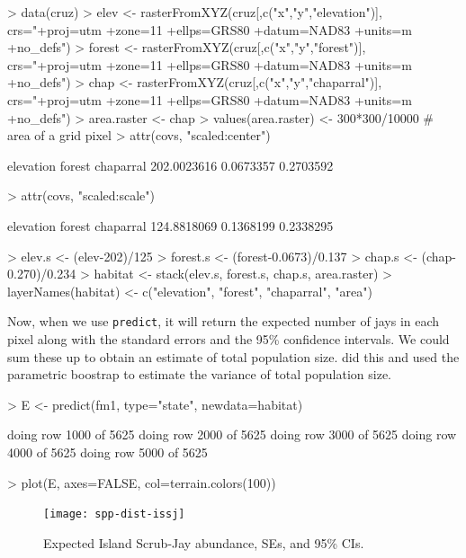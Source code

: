 \documentclass[a4paper]{article}
\renewenvironment{Schunk}{\vspace{\topsep}}{\vspace{\topsep}}
\begin{document}
\begin{Schunk}
\begin{Sinput}
> data(cruz)
> elev <- rasterFromXYZ(cruz[,c("x","y","elevation")],
      crs="+proj=utm +zone=11 +ellps=GRS80 +datum=NAD83 +units=m +no_defs")
> forest <- rasterFromXYZ(cruz[,c("x","y","forest")],
      crs="+proj=utm +zone=11 +ellps=GRS80 +datum=NAD83 +units=m +no_defs")
> chap <- rasterFromXYZ(cruz[,c("x","y","chaparral")],
      crs="+proj=utm +zone=11 +ellps=GRS80 +datum=NAD83 +units=m +no_defs")
> area.raster <- chap
> values(area.raster) <- 300*300/10000 # area of a grid pixel
> attr(covs, "scaled:center")
\end{Sinput}
\begin{Soutput}
  elevation      forest   chaparral 
202.0023616   0.0673357   0.2703592 
\end{Soutput}
\begin{Sinput}
> attr(covs, "scaled:scale")
\end{Sinput}
\begin{Soutput}
  elevation      forest   chaparral 
124.8818069   0.1368199   0.2338295 
\end{Soutput}
\begin{Sinput}
> elev.s <- (elev-202)/125
> forest.s <- (forest-0.0673)/0.137
> chap.s <- (chap-0.270)/0.234
> habitat <- stack(elev.s, forest.s, chap.s, area.raster)
> layerNames(habitat) <- c("elevation", "forest", "chaparral", "area")
\end{Sinput}
\end{Schunk}


Now, when we use \verb+predict+, it will return the expected number of
jays in each pixel along with the standard errors and the 95\%
confidence intervals. We could sum these up to obtain an estimate of
total population size. \citet{sillett_etal:2012} did this and used the
parametric boostrap to estimate the variance of total population
size.

\begin{Schunk}
\begin{Sinput}
> E <- predict(fm1, type="state", newdata=habitat)
\end{Sinput}
\begin{Soutput}
  doing row 1000 of 5625 
  doing row 2000 of 5625 
  doing row 3000 of 5625 
  doing row 4000 of 5625 
  doing row 5000 of 5625 
\end{Soutput}
\begin{Sinput}
> plot(E, axes=FALSE, col=terrain.colors(100))
\end{Sinput}
\end{Schunk}
\begin{figure}
  \centering
\texttt{[image: spp-dist-issj]}
\caption{Expected Island Scrub-Jay abundance, SEs, and 95\% CIs.}
\label{fig:issj}
\end{figure}







\newpage


\end{document}
